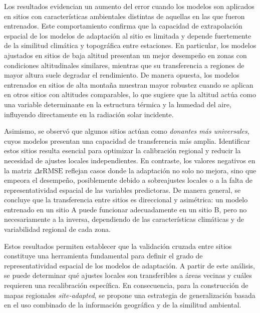 \documentclass[letterpaper,12pt, twoside]{report}
\providecommand{\DIFdeltex}[1]{{\protect\color{red} \scriptsize #1}} %
\providecommand{\DIFdel}[1]{\texorpdfstring{\DIFdeltex{#1}}{}} %
\begin{document}
\DIFdel{Los resultados evidencian un aumento del error cuando los modelos son aplicados en sitios con características ambientales distintas de aquellas en las que fueron entrenados. Este comportamiento confirma que la capacidad de extrapolación espacial de los modelos de adaptación al sitio es limitada y depende fuertemente de la similitud climática y topográfica entre estaciones. En particular, los modelos ajustados en sitios de baja altitud presentan un mejor desempeño en zonas con condiciones altitudinales similares, mientras que su transferencia a regiones de mayor altura suele degradar el rendimiento. De manera opuesta, los modelos entrenados en sitios de alta montaña muestran mayor robustez cuando se aplican en otros sitios con altitudes comparables, lo que sugiere que la altitud actúa como una variable determinante en la estructura térmica y la humedad del aire, influyendo directamente en la radiación solar incidente.
}%

\DIFdel{Asimismo, se observó que algunos sitios actúan como \textit{donantes más universales}, cuyos modelos presentan una capacidad de transferencia más amplia. Identificar estos sitios resulta esencial para optimizar la calibración regional y reducir la necesidad de ajustes locales independientes. En contraste, los valores negativos en la matriz $\Delta \text{rRMSE}$ reflejan casos donde la adaptación no solo no mejora, sino que empeora el desempeño, posiblemente debido a sobreajustes locales o a la falta de representatividad espacial de las variables predictoras. De manera general, se concluye que la transferencia entre sitios es direccional y asimétrica: un modelo entrenado en un sitio A puede funcionar adecuadamente en un sitio B, pero no necesariamente a la inversa, dependiendo de las características climáticas y de variabilidad regional de cada zona.
}%

\DIFdel{Estos resultados permiten establecer que la validación cruzada entre sitios constituye una herramienta fundamental para definir el grado de representatividad espacial de los modelos de adaptación. A partir de este análisis, se puede determinar qué ajustes locales son transferibles a áreas vecinas y cuáles requieren una recalibración específica. En consecuencia, para la construcción de mapas regionales \textit{site-adapted}, se propone una estrategia de generalización basada en el uso combinado de la información geográfica y de la similitud ambiental.
}%

\end{document}
